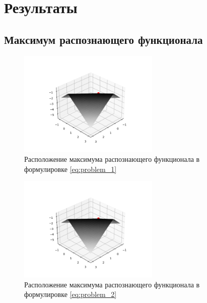 \documentclass{article}
\begin{document}
  \clearpage

  \section{Результаты}

  \subsection{Максимум распознающего функционала}

  \begin{figure}[htbp!]
		\begin{center}
			\includegraphics[width = 0.6\textwidth]{tol_1}
			\caption{Расположение максимума распознающего функционала в
        формулировке \ref{eq:problem_1}}
      \label{figure:tol_1}
		\end{center}
	\end{figure}

  \begin{figure}[htbp!]
		\begin{center}
			\includegraphics[width = 0.6\textwidth]{tol_2}
			\caption{Расположение максимума распознающего функционала в
        формулировке \ref{eq:problem_2}}
      \label{figure:tol_1}
		\end{center}
	\end{figure}
\end{document}
